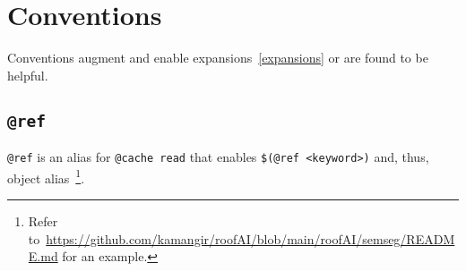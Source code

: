 \section{Conventions}
\label{conventions}

Conventions augment and enable expansions~\ref{expansions} or are found to be helpful.





\subsection{\texttt{@ref}}
\label{ref}

\texttt{@ref} is an alias for \texttt{@cache read} that enables \texttt{\$(@ref <keyword>)} and, thus, object alias~\footnote{Refer to~\url{https://github.com/kamangir/roofAI/blob/main/roofAI/semseg/README.md} for an example.}.